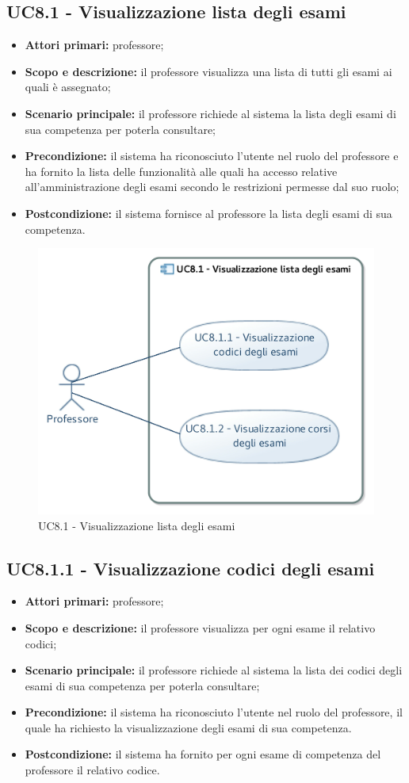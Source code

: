 \documentclass[AnalisiDeiRequisiti.tex]{subfiles}
\begin{document}
\subsection{UC8.1 - Visualizzazione lista degli esami}
\begin{itemize}
	\item \textbf{Attori primari:} professore;
	\item \textbf{Scopo e descrizione:} il professore visualizza una lista di tutti gli esami ai quali è assegnato;
	\item \textbf{Scenario principale:} il professore richiede al sistema la lista degli esami di sua competenza per poterla consultare;
	\item \textbf{Precondizione:} il sistema ha riconosciuto l'utente nel ruolo del professore e ha fornito la lista delle funzionalità alle quali ha accesso relative all'amministrazione degli esami secondo le restrizioni permesse dal suo ruolo; 
	\item \textbf{Postcondizione:} il sistema fornisce al professore la lista degli esami di sua competenza.
\end{itemize}
\begin{figure}[H]
	\centering
	\includegraphics[width=0.7\linewidth]{UC8_1.jpg}
	\caption{UC8.1 - Visualizzazione lista degli esami}
	\label{UC8.1 - Visualizzazione lista degli esami}
\end{figure}
\subsection{UC8.1.1 - Visualizzazione codici degli esami}
\begin{itemize}
	\item \textbf{Attori primari:} professore;
	\item \textbf{Scopo e descrizione:} il professore visualizza per ogni esame il relativo codici;
	\item \textbf{Scenario principale:} il professore richiede al sistema la lista dei codici degli esami di sua competenza per poterla consultare;
	\item \textbf{Precondizione:} il sistema ha riconosciuto l'utente nel ruolo del professore, il quale ha richiesto la visualizzazione degli esami di sua competenza.
	\item \textbf{Postcondizione:} il sistema ha fornito per ogni esame di competenza del professore il relativo codice.
\end{itemize}
\end{document}
